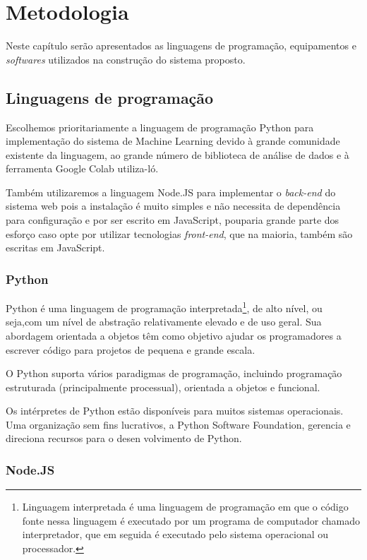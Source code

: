 \chapter{Metodologia}
Neste capítulo serão apresentados as linguagens de programação, equipamentos e \textit{softwares} utilizados na construção do sistema proposto.
\section{Linguagens de programação}

 Escolhemos prioritariamente a linguagem de programação Python para implementação do sistema de Machine Learning devido à grande comunidade existente da linguagem, ao grande número de biblioteca de análise de dados e à ferramenta Google Colab utiliza-ló.
 
 Também utilizaremos a linguagem Node.JS para implementar o \textit{back-end} do sistema web pois a instalação é muito simples e não necessita de dependência para configuração e por ser escrito em JavaScript, pouparia grande parte dos esforço caso opte por utilizar tecnologias \textit{front-end}, que na maioria, também são escritas em JavaScript.
 
\subsection{Python}

Python é uma linguagem de programação interpretada\footnote{Linguagem interpretada é uma linguagem de programação em que o código fonte nessa linguagem é executado por um programa de computador chamado interpretador, que em seguida é executado pelo sistema operacional ou processador.}, de alto nível, ou seja,com um nível de abstração relativamente elevado e de uso geral. Sua abordagem orientada a objetos têm como objetivo ajudar os programadores a escrever código para projetos de pequena e grande escala.

O Python suporta vários paradigmas de programação, incluindo programação estruturada (principalmente processual), orientada a objetos e funcional.

Os intérpretes de Python estão disponíveis para muitos sistemas operacionais. Uma organização sem fins lucrativos, a Python Software Foundation, gerencia e direciona recursos para o desen
volvimento de Python. \cite{van2007python}

\subsection{Node.JS}


